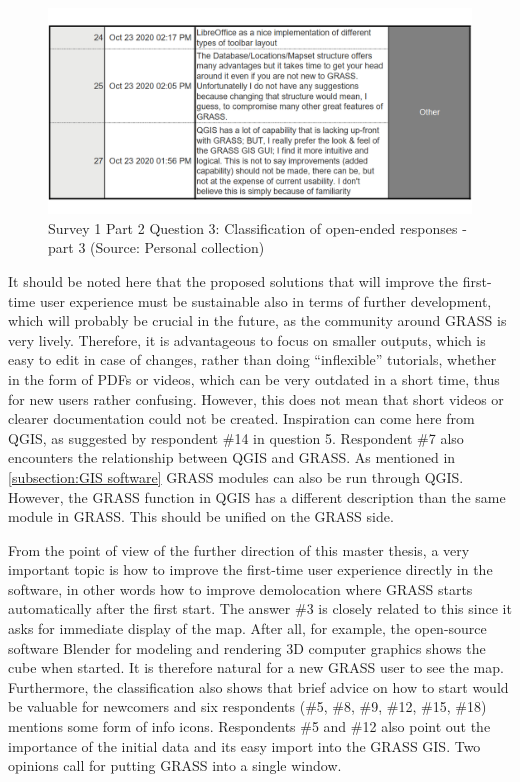 \documentclass[a4paper,10pt,twoside]{article}
\begin{document}
\newpage
\vspace{0.3cm}
\begin{figure}[hbt!] 
\begin{center}
\includegraphics[width=15cm]{../surveys/analyzed_data/survey1_part2_question3_open_ended-2_1} 
\caption[Survey 1 Part 2 Question 3: Classification of open-ended responses - part 3]{Survey 1 Part 2 Question 3: Classification of open-ended responses - part 3 (Source: Personal collection)}
\label{fig:survey1_part2_question3_open_ended3_1}
\end{center}
\end{figure}

\noindent It should be noted here that the proposed solutions that will improve the first-time user experience must be sustainable also in terms of further development, which will probably be crucial in the future, as the community around GRASS is very lively. Therefore, it is advantageous to focus on smaller outputs, which is easy to edit in case of changes, rather than doing ``inflexible'' tutorials, whether in the form of PDFs or videos, which can be very outdated in a short time, thus for new users rather confusing. However, this does not mean that short videos or clearer documentation could not be created. Inspiration can come here from QGIS, as suggested by respondent \#14 in question 5. Respondent \#7 also encounters the relationship between QGIS and GRASS. As mentioned in \ref{subsection:GIS software} GRASS modules can also be run through QGIS. However, the GRASS function in QGIS has a different description than the same module in GRASS. This should be unified on the GRASS side.

From the point of view of the further direction of this master thesis, a very important topic is how to improve the first-time user experience directly in the software, in other words how to improve demolocation where GRASS starts automatically after the first start. The answer \#3 is closely related to this since it asks for immediate display of the map. After all, for example, the open-source software Blender for modeling and rendering 3D computer graphics shows the cube when started. It is therefore natural for a new GRASS user to see the map. Furthermore, the classification also shows that brief advice on how to start would be valuable for newcomers and six respondents (\#5, \#8, \#9, \#12, \#15, \#18) mentions some form of info icons. Respondents \#5 and \#12 also point out the importance of the initial data and its easy import into the GRASS GIS. Two opinions call for putting GRASS into a single window.
\end{document}
